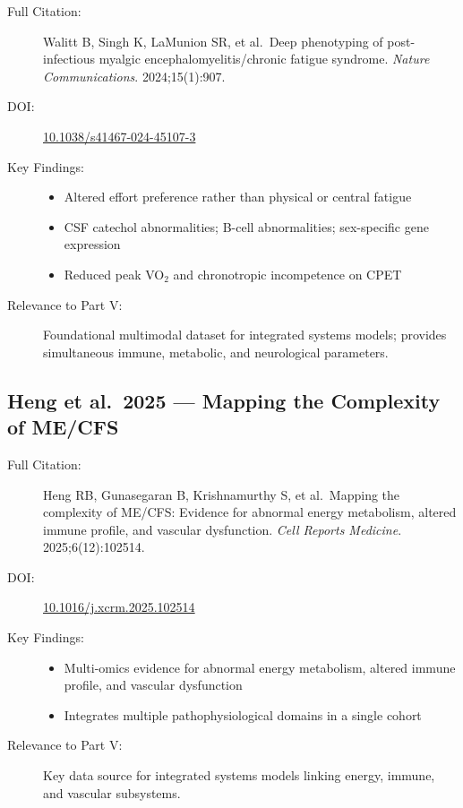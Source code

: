 \begin{description}
    \item[Full Citation:] Walitt B, Singh K, LaMunion SR, et al.\ Deep phenotyping of post-infectious myalgic encephalomyelitis/chronic fatigue syndrome. \textit{Nature Communications}. 2024;15(1):907. \cite{walitt2024deep}
    \item[DOI:] \href{https://doi.org/10.1038/s41467-024-45107-3}{10.1038/s41467-024-45107-3}
    \item[Key Findings:]
    \begin{itemize}
        \item Altered effort preference rather than physical or central fatigue
        \item CSF catechol abnormalities; B-cell abnormalities; sex-specific gene expression
        \item Reduced peak VO$_2$ and chronotropic incompetence on CPET
    \end{itemize}
    \item[Relevance to Part V:] Foundational multimodal dataset for integrated systems models; provides simultaneous immune, metabolic, and neurological parameters.
\end{description}

\subsection{Heng et al.\ 2025 --- Mapping the Complexity of ME/CFS}

\begin{description}
    \item[Full Citation:] Heng RB, Gunasegaran B, Krishnamurthy S, et al.\ Mapping the complexity of ME/CFS: Evidence for abnormal energy metabolism, altered immune profile, and vascular dysfunction. \textit{Cell Reports Medicine}. 2025;6(12):102514. \cite{heng2025mecfs}
    \item[DOI:] \href{https://doi.org/10.1016/j.xcrm.2025.102514}{10.1016/j.xcrm.2025.102514}
    \item[Key Findings:]
    \begin{itemize}
        \item Multi-omics evidence for abnormal energy metabolism, altered immune profile, and vascular dysfunction
        \item Integrates multiple pathophysiological domains in a single cohort
    \end{itemize}
    \item[Relevance to Part V:] Key data source for integrated systems models linking energy, immune, and vascular subsystems.
\end{description}

